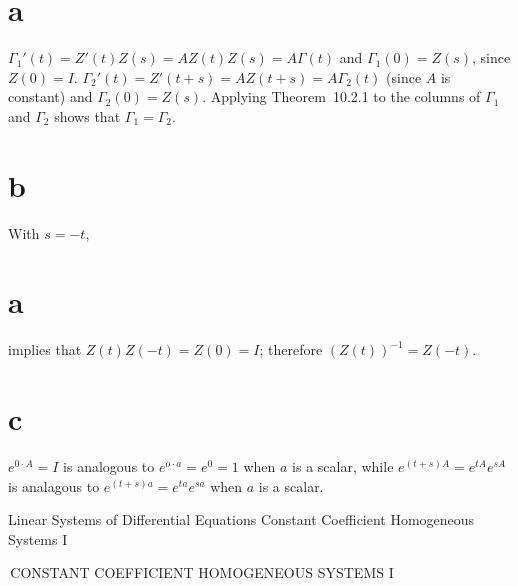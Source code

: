 \documentclass[dvips]{book}
\renewcommand{\exer}[1]{\par\medskip\;\noindent{\color{red}\bf #1.}}
\numberwithin{example}{section}
\numberwithin{equation}{section}
\numberwithin{theorem}{section}
\numberwithin{table}{section}
\numberwithin{figure}{section}
\begin{document}
\exer{10.3.18}
\part{a}
$\Gamma_1'(t)=Z'(t)Z(s)=AZ(t)Z(s)=A\Gamma(t)$ and $\Gamma_1(0)=Z(s)$,
since $Z(0)=I$.
$\Gamma_2'(t)=Z'(t+s)=AZ(t+s)=A\Gamma_2(t)$ (since $A$ is constant)
and $\Gamma_2(0)=Z(s)$. Applying Theorem~10.2.1  to the columns of
$\Gamma_1$ and $\Gamma_2$  shows that $\Gamma_1=\Gamma_2$.

\part{b} With $s=-t$, \part{a} implies that $Z(t)Z(-t)=Z(0)=I$;
therefore $(Z(t))^{-1}=Z(-t)$.

\part{c} $e^{0\cdot A}=I$ is analogous to $e^{o\cdot a}=e^{0}=1$ when
$a$ is a scalar, while $e^{(t+s)A}=e^{tA}e^{sA}$  is analagous
to $e^{(t+s)a}=e^{ta}e^{sa}$ when $a$ is a scalar.


 {Linear Systems of Differential  Equations}
{Constant Coefficient Homogeneous Systems I}

\renewcommand{\thissection}{\sectiontitle
{\,\quad CONSTANT COEFFICIENT HOMOGENEOUS SYSTEMS I}}
\thissection
      \vspace*{-17.5pt}
\end{document}
